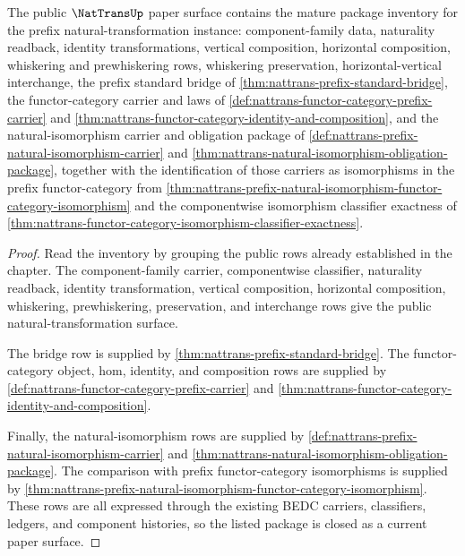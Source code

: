 \begin{theorem}
\label{thm:nattrans-mature-package-inventory}
The public $\NatTransUp$ paper surface contains the mature package inventory
for the prefix natural-transformation instance: component-family data,
naturality readback, identity transformations, vertical composition,
horizontal composition, whiskering and prewhiskering rows, whiskering
preservation, horizontal-vertical interchange, the prefix standard bridge of
\autoref{thm:nattrans-prefix-standard-bridge}, the functor-category carrier
and laws of
\autoref{def:nattrans-functor-category-prefix-carrier} and
\autoref{thm:nattrans-functor-category-identity-and-composition}, and the
natural-isomorphism carrier and obligation package of
\autoref{def:nattrans-prefix-natural-isomorphism-carrier} and
\autoref{thm:nattrans-natural-isomorphism-obligation-package}, together with
the identification of those carriers as isomorphisms in the prefix
functor-category from
\autoref{thm:nattrans-prefix-natural-isomorphism-functor-category-isomorphism}
and the componentwise isomorphism classifier exactness of
\autoref{thm:nattrans-functor-category-isomorphism-classifier-exactness}.
\end{theorem}
\begin{proof}
Read the inventory by grouping the public rows already established in the
chapter. The component-family carrier, componentwise classifier, naturality
readback, identity transformation, vertical composition, horizontal
composition, whiskering, prewhiskering, preservation, and interchange rows
give the public natural-transformation surface.

The bridge row is supplied by
\autoref{thm:nattrans-prefix-standard-bridge}. The functor-category object,
hom, identity, and composition rows are supplied by
\autoref{def:nattrans-functor-category-prefix-carrier} and
\autoref{thm:nattrans-functor-category-identity-and-composition}.

Finally, the natural-isomorphism rows are supplied by
\autoref{def:nattrans-prefix-natural-isomorphism-carrier} and
\autoref{thm:nattrans-natural-isomorphism-obligation-package}. The comparison
with prefix functor-category isomorphisms is supplied by
\autoref{thm:nattrans-prefix-natural-isomorphism-functor-category-isomorphism}.
These rows are all expressed through the existing BEDC carriers, classifiers,
ledgers, and component histories, so the listed package is closed as a current
paper surface.
\end{proof}

